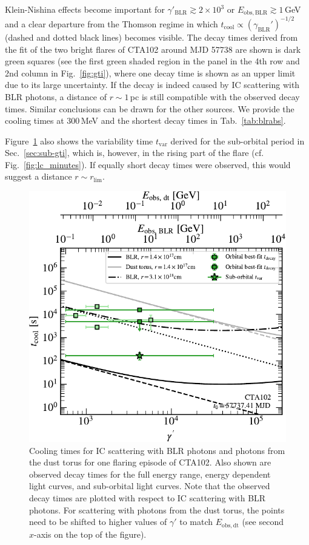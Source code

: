 \documentclass[twocolumn,linenumbers]{aastex62}
\begin{document}
Klein-Nishina effects become important for $\gamma'_\mathrm{BLR} \gtrsim 2\times10^3$ or $E_\mathrm{obs,BLR}\gtrsim1\,$GeV and a clear departure from the Thomson regime in which 
$t_\mathrm{cool}\propto(\gamma_\mathrm{BLR}')^{-1/2}$ (dashed and dotted black lines) becomes visible.
The decay times derived from the fit of the two bright flares of CTA102 around MJD 57738 are shown is dark green squares (see the first green shaded region in the panel in the 4th row and 2nd column in Fig.~\ref{fig:gti}), where one decay time is shown as an upper limit due to its large uncertainty. 
If the decay is indeed caused by IC scattering with BLR photons, a distance of $r\sim1\,$pc is still compatible with the observed decay times. 
Similar conclusions can be drawn for the other sources. 
We provide the cooling times at 300\,MeV and the shortest decay times in Tab.~\ref{tab:blrabs}.

Figure~\ref{fig:tcool} also shows the variability time $t_\mathrm{var}$ derived for the sub-orbital period in Sec.~\ref{sec:sub-gti}, which is, however, in the rising part of the flare (cf. Fig.~\ref{fig:lc_minutes}). If equally short decay times were observed, this would suggest a distance $r \sim r_\mathrm{lim}$. 

\begin{figure}
    \centering
    \includegraphics[width = .9\linewidth]{figures/tcool_CTA102_t001_LogParabola_ring.pdf}
    \caption{Cooling times for IC scattering with BLR photons and photons from the dust torus for one flaring episode of CTA102. Also shown are observed decay times for the full energy range, energy dependent light curves, and sub-orbital light curves.
    Note that the observed decay times are plotted with respect to IC scattering with BLR photons. For scattering with photons from the dust torus, the points need to be shifted to higher values of $\gamma'$ to match $E_\mathrm{obs,dt}$ (see second $x$-axis on the top of the figure).}
    \label{fig:tcool}
\end{figure}
\end{document}
